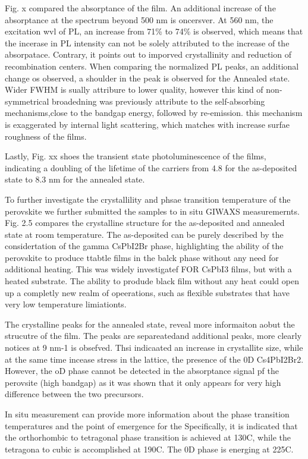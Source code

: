 Fig. x compared the absorptance of the film. An additional increase of the absorptance at the spectrum beyond 500 nm is oncersver. At 560 nm, the excitation wvl of PL,  an increase from 71\% to 74\% is observed, which means that the incerase in PL intensity can not be solely attributed to the increase of the absorpatace. Contrary, it points out to imporved crystallinity and reduction of recombination centers. When comparing the normalized PL peaks, an additional change os observed, a shoulder in the peak is observed for the Annealed state. Wider FWHM is sually attribure to lower quality, however this kind of non-symmetrical broadedning was previously attribute to the self-absorbing mechanisms,close to the bandgap energy, followed by re-emission. this mechanism is exaggerated by internal light scattering, which matches with increase surfae roughness of the films. 

Lastly, Fig. xx shoes the transient state photoluminescence of the films, indicating a doubling of the lifetime of the carriers from 4.8 for the as-deposited state to 8.3 nm for the annealed state. 

To further investigate the crystallility and phsae transition temperature of the perovskite we further submitted the samples to in situ GIWAXS measuremernts. Fig. 2.5 compares the crystalline structure for the as-deposited and annealed state at room temperature. The as-deposited can be purely described by the considertation of the gamma CsPbI2Br phase, highlighting the ability of the perovskite to produce ttabtle films in the balck phase without any need for additional heating. This was widely investigatef FOR CsPbI3 films, but with a heated substrate. The ability to produde black film without any heat could open up a completly new realm of opeerations, such as flexible substrates that have very low temperature limiationts. 

The crystalline peaks for the annealed state, reveal more informaiton aobut the strucutre of the film. The peaks are separeatedand additional peaks, more clearly notices at 9 nm-1 is obsefved. Thsi indicaated an increase in crystallite size, while at the same time incease stress in the lattice, the presence of the 0D Cs4PbI2Br2. However, the oD phase cannot be detected in the absorptance signal pf the perovsite (high bandgap) as it was shown that it only appears for very high difference between the two precursors.  

In situ measurement can provide more information about the phase transition temperatures and the point of emergence for the Specifically, it is indicated that the orthorhombic to tetragonal phase transition is achieved at 130C, while the tetragona to cubic is accomplished at 190C. The 0D phase is energing at 225C.



